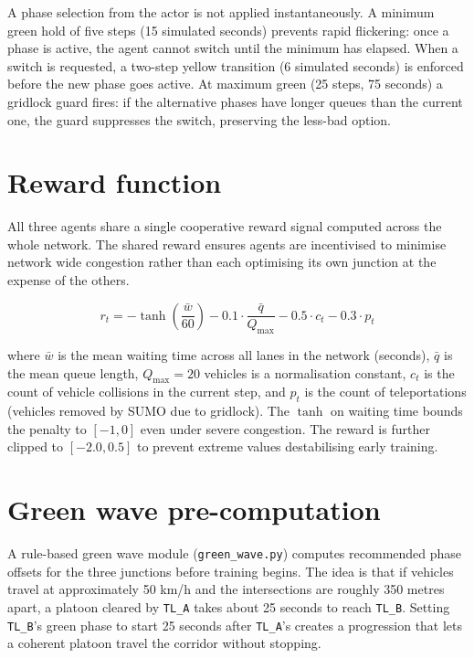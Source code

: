 ﻿\documentclass[11pt, a4paper]{report}
\begin{document}
A phase selection from the actor is not applied instantaneously. A minimum green hold of five steps (15 simulated seconds) prevents rapid flickering: once a phase is active, the agent cannot switch until the minimum has elapsed. When a switch is requested, a two-step yellow transition (6 simulated seconds) is enforced before the new phase goes active. At maximum green (25 steps, 75 seconds) a gridlock guard fires: if the alternative phases have longer queues than the current one, the guard suppresses the switch, preserving the less-bad option.

\section{Reward function}

All three agents share a single cooperative reward signal computed across the whole network. The shared reward ensures agents are incentivised to minimise network wide congestion rather than each optimising its own junction at the expense of the others.

\begin{equation}
r_t = -\tanh\!\left(\frac{\bar{w}}{60}\right) - 0.1 \cdot \frac{\bar{q}}{Q_{\max}} - 0.5 \cdot c_t - 0.3 \cdot p_t
\label{eq:reward}
\end{equation}

where $\bar{w}$ is the mean waiting time across all lanes in the network (seconds), $\bar{q}$ is the mean queue length, $Q_{\max} = 20$ vehicles is a normalisation constant, $c_t$ is the count of vehicle collisions in the current step, and $p_t$ is the count of teleportations (vehicles removed by SUMO due to gridlock). The $\tanh$ on waiting time bounds the penalty to $[-1, 0]$ even under severe congestion. The reward is further clipped to $[-2.0, 0.5]$ to prevent extreme values destabilising early training.

\section{Green wave pre-computation}

A rule-based green wave module (\texttt{green\_wave.py}) computes recommended phase offsets for the three junctions before training begins. The idea is that if vehicles travel at approximately 50 km/h and the intersections are roughly 350 metres apart, a platoon cleared by \texttt{TL\_A} takes about 25 seconds to reach \texttt{TL\_B}. Setting \texttt{TL\_B}'s green phase to start 25 seconds after \texttt{TL\_A}'s creates a progression that lets a coherent platoon travel the corridor without stopping.
\end{document}
